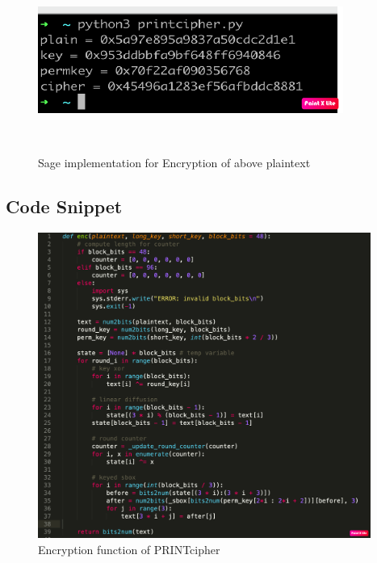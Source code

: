 \documentclass[journal=tosc,preprint]{iacrtrans}
\begin{document}
\begin{figure}
	\centering
	\includegraphics[height=6cm, width=10cm]{pics/pic_3.png}
	\caption{Sage implementation for Encryption of above plaintext}
\end{figure}


\newpage
\subsection{Code Snippet}
\begin{figure}[ht]
	\centering
	\includegraphics[height=10cm, width=\linewidth]{pics/codesnippet.png}
	\caption{Encryption function of PRINTcipher}
\end{figure}



%
%
\end{document}
